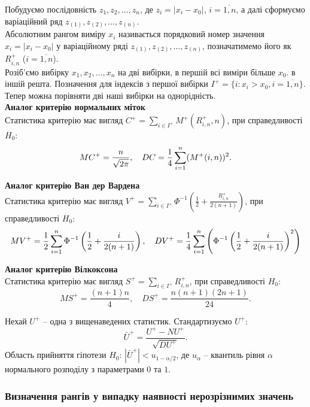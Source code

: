 Побудуємо послідовність $z_1, z_2, \ldots, z_n$, де $z_i = |x_i - x_0|$, $i = \overline{1, n}$, а далі сформуємо варіаційний ряд $z_{(1)}, z_{(2)}, \ldots, z_{(n)}$. \\

Абсолютним рангом виміру $x_i$ називається порядковий номер значення $x_i = |x_i - x_0|$ у варіаційному ряді $z_{(1)}, z_{(2)}, \ldots, z_{(n)}$, позначатимемо його як $R_{i,n}^+$ ($i=\overline{1,n}$). \\

Розіб'ємо вибірку $x_1, x_2, \ldots, x_n$ на дві вибірки, в першій всі виміри більше $x_0$. в іншій решта. Позначення для індексів з першої вибірки $I^+ = \{ i : x_i > x_0, i = \overline{1,n} \}$. Тепер можна порівняти дві наші вибірки на однорідність. \\

\textbf{Аналог критерію нормальних міток} \\

Статистика критерію має вигляд $C^+ = \sum_{i \in I^+} M^+(R_{i,n}^+, n)$, при справедливості $H_0$: \[ MC^+ = \dfrac{n}{\sqrt{2\pi}}, \quad DC = \dfrac{1}{4} \displaystyle\sum\limits_{i=1}^n (M^+(i, n))^2. \]

\textbf{Аналог критерію Ван дер Вардена} \\

Статистика критерію має вигляд $V^+ = \sum_{i \in I^+} \Phi^{-1} \left( \frac{1}{2} + \frac{R_{i,n}^+}{2(n + 1)} \right)$, при справедливості $H_0$: \[ MV^+ = \dfrac{1}{2} \displaystyle\sum\limits_{i=1}^n \Phi^{-1} \left( \dfrac{1}{2} + \dfrac{i}{2(n + 1)} \right), \quad DV^+ = \dfrac{1}{4} \displaystyle\sum\limits_{i=1}^n \left( \Phi^{-1} \left( \dfrac{1}{2} + \dfrac{i}{2(n + 1)} \right)^2 \right) \]

\textbf{Аналог критерію Вілкоксона} \\

Статистика критерію має вигляд  $S^+ = \sum_{i\in I^+} R_{i, n}^+$, при справедливості $H_0$: \[ MS^+ = \dfrac{(n+1)n}{4}, \quad DS^+ = \dfrac{n(n+1)(2n+1)}{24}. \]

Нехай $U^+$ -- одна з вищенаведених статистик. Стандартизуємо $U^+$: \[\bar{U}^+ = \frac{U^+ - NU^+}{\sqrt{DU^+}}.\] Область прийняття гіпотези $H_0$: $|\bar{U}^+| < u_{1 - \alpha / 2}$, де $u_\alpha$ -- квантиль рівня $\alpha$ нормального розподілу з параметрами $0$ та $1$.

\subsubsection{Визначення рангів у випадку наявності нерозрізнимих значень}

